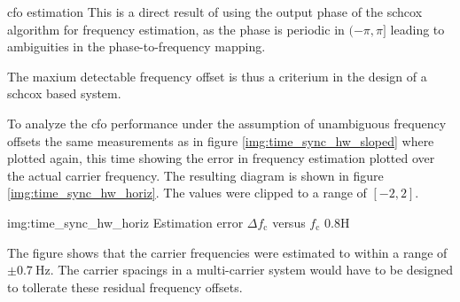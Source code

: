 \begin{subchapter}{\Acrlong{cfo} estimation}
  This is a direct result of using the output phase
  of the \gls{schcox} algorithm for frequency estimation,
  as the phase is periodic in $(-\pi, \pi]$ leading to
  ambiguities in the phase-to-frequency mapping.

  The maxium detectable frequency offset is thus
  a criterium in the design of a \gls{schcox}
  based system.

  To analyze the \gls{cfo} performance under the assumption
  of unambiguous frequency offsets the same measurements
  as in figure \ref{img:time_sync_hw_sloped} where plotted
  again, this time showing the error in frequency estimation
  plotted over the actual carrier frequency.
  The resulting diagram is shown in
  figure \ref{img:time_sync_hw_horiz}.
  The values were clipped to a range of $[-2, 2]$.

                  {img:time_sync_hw_horiz}
                  {Estimation error $\Delta f_\text{c}$ versus $f_\text{c}$}
                  {0.8}{H}

  The figure shows that the carrier frequencies were
  estimated to within a range of $\pm\SI{0.7}{\hertz}$.
  The carrier spacings in a multi-carrier system
  would have to be designed to tollerate these residual
  frequency offsets.
\end{subchapter}

